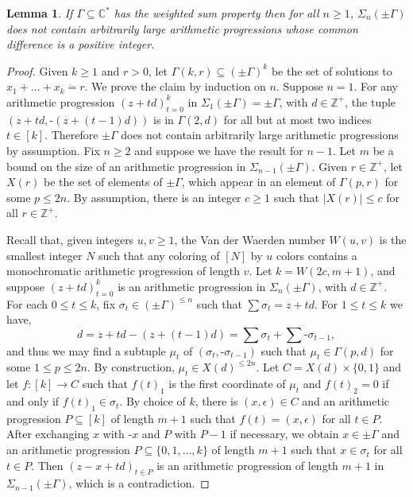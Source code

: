 \documentclass{amsart}
\def\seq{\subseteq}
\newcommand{\nv}{\text{-}}
\newcommand{\de}{\mathbin{\dot{=}}}
\def\C{\mathbb C}
\def\Z{\mathbb Z}
\newtheorem{lemma}[theorem]{Lemma}
\theoremstyle{definition}
\begin{document}
\begin{lemma}\label{lem:VDW}
If $\Gamma\seq\C^*$ has the weighted sum property then for all $n\geq 1$, $\Sigma_n(\pm \Gamma)$ does not contain arbitrarily large arithmetic progressions whose common difference is a positive integer.
\end{lemma}
\begin{proof}
 Given $k\geq 1$ and $r>0$, let $\Gamma(k,r)\seq (\pm \Gamma)^k$ be the set of solutions to $x_1+\ldots+x_k\de r$. We prove the claim by induction on $n$. Suppose $n=1$. For any arithmetic progression $(z+td)_{t=0}^k$ in $\Sigma_1(\pm\Gamma)=\pm\Gamma$, with $d\in\Z^+$, the tuple $(z+td,\nv(z+(t-1)d))$ is in $\Gamma(2,d)$ for all but at most two indices $t\in [k]$. Therefore $\pm \Gamma$ does not contain arbitrarily large arithmetic progressions by assumption. Fix $n\geq 2$ and suppose we have the result for $n-1$. Let $m$ be a bound on the size of an arithmetic progression in $\Sigma_{n-1}(\pm \Gamma)$. Given $r\in\Z^+$, let $X(r)$ be the set of elements of $\pm\Gamma$, which appear in an element of $\Gamma(p,r)$ for some $p\leq 2n$. By assumption, there is an integer $c\geq 1$ such that $|X(r)|\leq c$ for all $r\in\Z^+$. 
 
 Recall that, given integers $u,v\geq 1$, the Van der Waerden number $W(u,v)$ is the smallest integer $N$ such that any coloring of $[N]$ by $u$ colors contains a monochromatic arithmetic progression of length $v$. Let $k=W(2c,m+1)$, and suppose $(z+td)_{t=0}^k$ is an arithmetic progression in $\Sigma_n(\pm \Gamma)$, with $d\in\Z^+$. For each $0\leq t\leq k$, fix $\sigma_t\in (\pm \Gamma)^{\leq n}$ such that $\sum \sigma_t=z+td$. For $1\leq t\leq k$ we have,
\[
d=z+td-(z+(t-1)d)=\sum \sigma_t+\sum\nv\sigma_{t-1},
\]
and thus we may find a subtuple $\mu_t$ of $(\sigma_t,\nv\sigma_{t-1})$ such that $\mu_t\in \Gamma(p,d)$ for some $1\leq p\leq 2n$. By construction, $\mu_t\in X(d)^{\leq 2n}$. Let $C=X(d)\times\{0,1\}$ and let $f\colon [k]\to C$ such that $f(t)_1$ is the first coordinate of $\mu_t$ and $f(t)_2=0$ if and only if $f(t)_1\in\sigma_t$. By choice of $k$, there is $(x,\epsilon)\in C$ and an arithmetic progression $P\seq[k]$ of length $m+1$ such that $f(t)=(x,\epsilon)$ for all $t\in P$. After exchanging $x$ with $\nv x$ and $P$ with $P-1$ if necessary, we obtain $x\in\pm \Gamma$ and an arithmetic progression $P\seq\{0,1,\ldots,k\}$ of length $m+1$ such that $x\in\sigma_t$ for all $t\in P$. Then $(z-x+td)_{t\in P}$ is an arithmetic progression of length $m+1$ in $\Sigma_{n-1}(\pm \Gamma)$, which is a contradiction. 
\end{proof}
\end{document}
